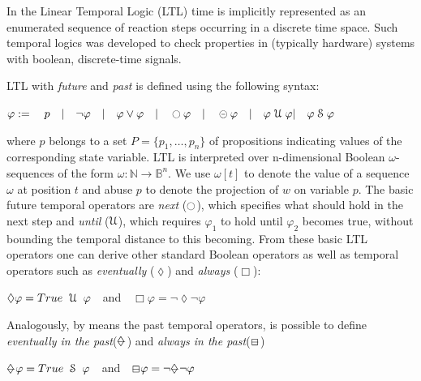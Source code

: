 In the Linear Temporal Logic (LTL) time is implicitly represented as an enumerated sequence of reaction steps occurring in a discrete time space. Such temporal logics was developed to check properties in (typically hardware) systems with boolean, discrete-time signals. 
\par LTL with \textit{future} and \textit{past} is defined using the following
syntax:
\begin{center}
$\varphi := \quad p \quad | \quad \neg \varphi \quad | \quad \varphi \vee \varphi \quad | \quad \ocircle  \varphi \quad | \quad \circleddash \varphi \quad | \quad \varphi \; \EuScript{U} \; \varphi |  \quad \varphi \; \EuScript{S} \; \varphi $
\end{center}
where $p$ belongs to a set $P = \{ p_1,\dots,p_n \}$ of propositions indicating values of the corresponding state variable. LTL is interpreted over n-dimensional Boolean $\omega$-sequences of the form $\omega : \mathbb{N} \rightarrow \mathbb{B}^n$. We use $\omega[t]$ to denote the value of a sequence $\omega$ at position $t$ and abuse $p$ to denote the projection of $w$ on variable $p$. The basic future temporal operators are \textit{next} ($\ocircle$), which specifies what should hold in the next step and \textit{until} ($\EuScript{U}$), which requires $\varphi_1$ to hold until $\varphi_2$ becomes true, without bounding the temporal distance to this becoming. From these basic LTL operators one can derive other standard Boolean operators as well as temporal operators such as \textit{eventually} ($\lozenge$) and \textit{always} ($\Box$): 
\begin{center}
$\lozenge \varphi = True \;\; \EuScript{U} \;\; \varphi\quad$and$\quad \Box \varphi = \neg \lozenge \neg \varphi$
\end{center}
Analogously, by means the past temporal operators, is possible to define \textit{eventually in the past}($\mathrlap{\lozenge}{-}$) and \textit{always in the past}($\mathrlap{\Box}{-}$)
\begin{center}
$\mathrlap{\lozenge}{-} \varphi =  True \;\; \EuScript{S}  \;\; \varphi\quad$and$\quad\mathrlap{\Box}{-} \varphi = \neg \mathrlap{\lozenge}{-} \neg \varphi$
\end{center}

